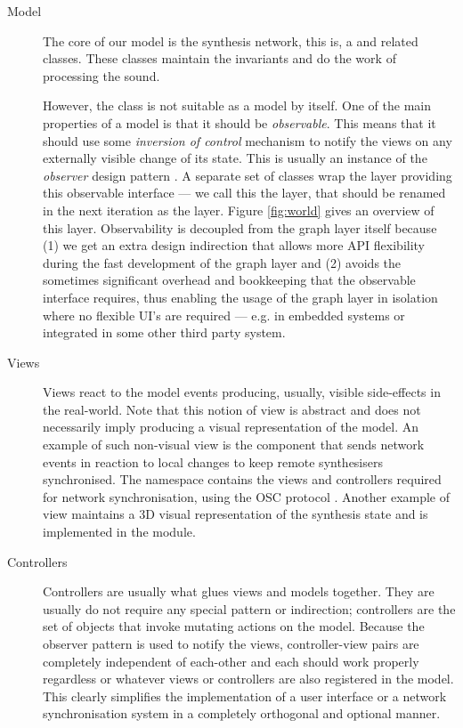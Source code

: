 \begin{description}
\item[Model] The core of our model is the synthesis
  network, this is, a  and related classes. These classes
  maintain the invariants and do the work of processing the sound.

  However, the  class is not suitable as a model by
  itself. One of the main properties of a model is that it should be
  \emph{observable}. This means that it should use some
  \emph{inversion of control} mechanism to notify the views on any
  externally visible change of its state. This is usually an instance
  of the \emph{observer} design pattern \cite{gamma95design,
    vlissides98pattern}. A separate
  set of classes wrap the  layer providing this
  observable interface --- we call this the 
  layer, that should be renamed in the next iteration as the
   layer. Figure \ref{fig:world} gives an overview
  of this layer. Observability is decoupled from the graph layer
  itself because (1) we get an extra design indirection that allows
  more API flexibility during the fast development of the graph layer
  and (2) avoids the sometimes significant overhead and bookkeeping
  that the observable interface requires, thus enabling the usage of
  the graph layer in isolation where no flexible UI's are required ---
  e.g. in embedded systems or integrated in some other third party
  system.

\item[Views] Views react to the model events producing, usually,
  visible side-effects in the real-world. Note that this notion of
  view is abstract and does not necessarily imply producing a visual
  representation of the model. An example of such non-visual view is
  the component that sends network events in reaction to local changes
  to keep remote synthesisers synchronised. The 
  namespace contains the views and controllers required for network
  synchronisation, using the  OSC
  protocol \cite{center03osc}. Another example of view maintains a 3D
  visual representation of the synthesis state and is implemented in
  the  module.

\item[Controllers] Controllers are usually what glues views and models
  together. They are usually do not require any special pattern or
  indirection; controllers are the set of objects that invoke mutating
  actions on the model. Because the observer pattern is used to notify
  the views, controller-view pairs are completely independent of
  each-other and each should work properly regardless or whatever
  views or controllers are also registered in the model. This clearly
  simplifies the implementation of a user interface or a network
  synchronisation system in a completely orthogonal and optional
  manner.
\end{description}
